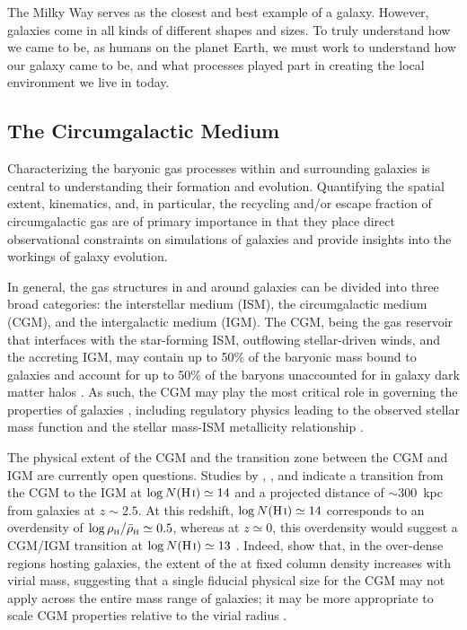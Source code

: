 The Milky Way serves as the closest and best example of a galaxy. However, galaxies come in all kinds of different shapes and sizes. To truly understand how we came to be, as humans on the planet Earth, we must work to understand how our galaxy came to be, and what processes played part in creating the local environment we live in today.

\subsection{The Circumgalactic Medium}
\label{ch1:cgm}

Characterizing the baryonic gas processes within and surrounding galaxies is central to understanding their formation and evolution. Quantifying the spatial extent, kinematics, and, in particular, the recycling and/or escape fraction of circumgalactic gas are of primary importance in that they place direct observational constraints on simulations of galaxies and provide insights into the workings of galaxy evolution.

In general, the gas structures in and around galaxies can be divided into three broad categories: the interstellar medium (ISM), the circumgalactic medium (CGM), and the intergalactic medium (IGM). The CGM, being the gas reservoir that interfaces with the star-forming ISM, outflowing stellar-driven winds, and the accreting IGM, may contain up to 50\% of the baryonic mass bound to galaxies \citep{Tumlinson2011} and account for up to 50\% of the baryons unaccounted for in galaxy dark matter halos \citep{Werk2014}.  As such, the CGM may play the most critical role in governing the properties of galaxies \citep[e.g.,][]{Oppenheimer2010, MAGIICAT3}, including regulatory physics leading to the observed stellar mass function \citep[e.g.,][]{Behroozi2013} and the stellar mass-ISM metallicity relationship \citep[e.g.,][]{Tremonti2004}.

The physical extent of the CGM and the transition zone between the CGM and IGM are currently open questions. Studies by \citet{Steidel2010}, \citet{Prochaska2011}, and \citet{Rudie2013} indicate a transition from the CGM to the IGM at $\log N({\hbox{{\rm H}\kern 0.1em{\sc i}}}) \simeq 14$ and a projected distance of $\sim\! 300$~kpc from galaxies at $z\sim 2.5$.  At this redshift, $\log N({\hbox{{\rm H}\kern 0.1em{\sc i}}}) \simeq 14$ corresponds to an overdensity of $\log \rho_{\hbox{\tiny H}}/\bar{\rho}_{\hbox{\tiny H}} \simeq 0.5$, whereas at $z\simeq 0$, this overdensity would suggest a CGM/IGM transition at $\log N({\hbox{{\rm H}\kern 0.1em{\sc i}}}) \simeq 13$ \citep[see][]{Dave1999}.  Indeed, \citet{Ford2013mass} show that, in the over-dense regions hosting galaxies, the extent of the {\HI} at fixed column density increases with virial mass, suggesting that a single fiducial physical size for the CGM may not apply across the entire mass range of galaxies; it may be more appropriate to scale CGM properties relative to the virial radius \citep[e.g.,][]{CWC2013Masses,MAGIICAT3}.

